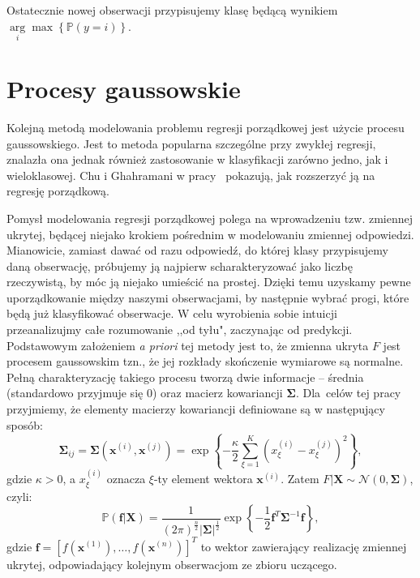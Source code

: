 \documentclass{mini}
\newcommand{\argmax}{\arg\!\max}
\begin{document}
Ostatecznie nowej obserwacji przypisujemy klasę będącą wynikiem $\underset{i}\argmax \left\lbrace\mathbb{P}(y=i)\right\rbrace$.

\section{Procesy gaussowskie}

Kolejną metodą modelowania problemu regresji porządkowej jest użycie procesu gaussowskiego. Jest to metoda popularna szczególne przy zwykłej regresji, znalazła ona jednak również zastosowanie w klasyfikacji zarówno jedno, jak i wieloklasowej. Chu i Ghahramani w pracy~\cite{reg} pokazują, jak rozszerzyć ją na regresję porządkową. 

Pomysł modelowania regresji porządkowej polega na wprowadzeniu tzw. zmiennej ukrytej, będącej niejako krokiem pośrednim w modelowaniu zmiennej odpowiedzi. Mianowicie, zamiast dawać od razu odpowiedź, do której klasy przypisujemy daną obserwację, próbujemy ją najpierw scharakteryzować jako liczbę rzeczywistą, by móc ją niejako umieścić na prostej. Dzięki temu uzyskamy pewne uporządkowanie między naszymi obserwacjami, by następnie wybrać progi, które będą już klasyfikować obserwacje. W celu wyrobienia sobie intuicji przeanalizujmy całe rozumowanie ,,od tyłu", zaczynając od predykcji. Podstawowym założeniem \textit{a priori} tej metody jest to, że zmienna ukryta $F$ jest procesem gaussowskim tzn., że jej rozkłady skończenie wymiarowe są normalne. Pełną charakteryzację takiego procesu tworzą dwie informacje -- średnia (standardowo przyjmuje się $0$) oraz macierz kowariancji $\mathbf{\Sigma}$. Dla~celów tej pracy przyjmiemy, że elementy macierzy kowariancji definiowane są w następujący sposób:
$$
\mathbf{\Sigma}_{ij} = \mathbf{\Sigma}(\textbf{x}^{(i)}, \textbf{x}^{(j)}) = \exp \left\lbrace -\frac{\kappa}{2}\sum_{\xi=1}^K (x^{(i)}_{\xi} - x^{(j)}_{\xi})^2\right\rbrace,
$$
gdzie $\kappa>0$, a $x^{(i)}_{\xi}$ oznacza $\xi$-ty element wektora $\mathbf{x}^{(i)}$. Zatem $F | \mathbf{X} \sim \mathcal{N}(0, \mathbf{\Sigma})$, czyli:
\begin{equation}\label{apriori}
\mathbb{P}(\mathbf{f} | \mathbf{X}) = \frac{1}{(2\pi)^{\frac{n}{2}}|\mathbf{\Sigma}|^{\frac{1}{2}}}\exp\left\lbrace -\frac{1}{2}\mathbf{f}^T\mathbf{\Sigma}^{-1}\mathbf{f} \right\rbrace,
\end{equation}
gdzie $\mathbf{f} = [f(\mathbf{x}^{(1)}), \ldots, f(\mathbf{x}^{(n)})]^T$ to wektor zawierający realizację zmiennej ukrytej, odpowiadający kolejnym obserwacjom ze zbioru uczącego.
\end{document}
